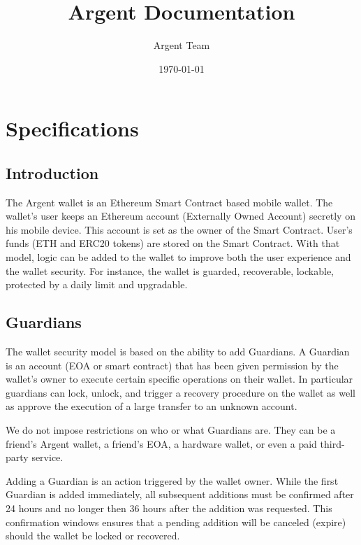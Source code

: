 \documentclass[12pt]{article}
\title{Argent Documentation}
\author{Argent Team}
\date{\today}
\begin{document}
\maketitle

\section{Specifications}

\subsection{Introduction}

The Argent wallet is an Ethereum Smart Contract based mobile wallet. The wallet's user keeps an Ethereum account (Externally Owned Account) secretly on his mobile device. This account is set as the owner of the Smart Contract. User's funds (ETH and ERC20 tokens) are stored on the Smart Contract. With that model, logic can be added to the wallet to improve both the user experience and the wallet security. For instance, the wallet is guarded, recoverable, lockable, protected by a daily limit and upgradable.

\subsection{Guardians}

The wallet security model is based on the ability to add Guardians. A Guardian is an account (EOA or smart contract) that has been given permission by the wallet's owner to execute certain specific operations on their wallet. In particular guardians can lock, unlock, and trigger a recovery procedure on the wallet as well as approve the execution of a large transfer to an unknown account.

We do not impose restrictions on who or what Guardians are. They can be a friend's Argent wallet, a friend's EOA, a hardware wallet, or even a paid third-party service.

Adding a Guardian is an action triggered by the wallet owner. While the first Guardian is added immediately, all subsequent additions must be confirmed after 24 hours and no longer then 36 hours after the addition was requested. This confirmation windows ensures that a pending addition will be canceled (expire) should the wallet be locked or recovered.
\end{document}
